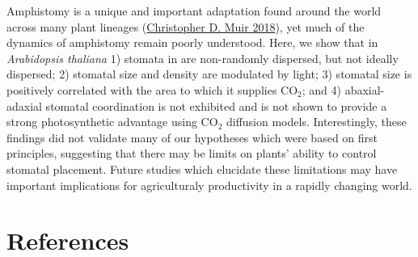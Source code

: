 \documentclass[12pt,halfline,a4paper,]{ouparticle}
\begin{document}
Amphistomy is a unique and important adaptation found around the world
across many plant lineages
(\protect\hyperlink{ref-muir_light_2018}{Christopher D. Muir 2018}), yet
much of the dynamics of amphistomy remain poorly understood. Here, we
show that in \emph{Arabidopsis thaliana} 1) stomata in are non-randomly
dispersed, but not ideally dispersed; 2) stomatal size and density are
modulated by light; 3) stomatal size is positively correlated with the
area to which it supplies CO\(_2\); and 4) abaxial-adaxial stomatal
coordination is not exhibited and is not shown to provide a strong
photosynthetic advantage using CO\(_2\) diffusion models. Interestingly,
these findings did not validate many of our hypotheses which were based
on first principles, suggesting that there may be limits on plants'
ability to control stomatal placement. Future studies which elucidate
these limitations may have important implications for agriculturaly
productivity in a rapidly changing world.

\hypertarget{references}{%
\section*{References}\label{references}}
\end{document}
